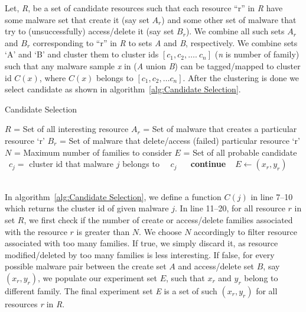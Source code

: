 Let, \emph{R}, be a set of candidate resources such that each resource ``r'' in \emph{R} have some malware set that create it (say set $A_r$) and some other set of malware that try to (unsuccessfully) access/delete it (say set $B_r$).
We combine all such sets $A_r$ and $B_r$ corresponding to ``r'' in \emph{R} to sets \emph{A} and \emph{B}, respectively.
We combine sets `A' and `B' and cluster them to cluster ids $[c_1,c_2,\ldots.\ c_n]$ (\emph{n} is number of family) such that any malware sample \emph{x} in (\emph{A} union \emph{B}) can be tagged/mapped to cluster id $C(x)$, where $C(x)$ belongs to $[c_1, c_2, \ldots c_n]$.
After the clustering is done we select candidate as shown in algorithm~\autoref{alg:Candidate Selection}.
\begin{algorithm}[ht]
\caption{Candidate Selection}
\label{alg:Candidate Selection}
\begin{algorithmic}[1]
    \State$R$   = Set of all interesting resource
    \State$A_r$ = Set of malware that creates a particular resource `r'
    \State$B_r$ = Set of malware that delete/access (failed) particular resource `r'
    \State$N$   = Maximum number of families to consider
    \State$E$   = Set of all probable candidate
      \State\ $c_j =$ cluster id that malware $j$ belongs to
      \State\ \Return\ $c_j$
    \EndFunction\
        \State\ \textbf{continue}
      \EndIf\
          \State$E\gets (x_r, y_r)$
        \EndIf\
      \EndFor\
    \EndFor\
  \end{algorithmic}
\end{algorithm}

In algorithm~\autoref{alg:Candidate Selection}, we define a function $C(j)$ in line 7--10 which returns the cluster id of given malware $j$.
In line 11--20, for all resource $r$ in set $R$, we first check if the number of create or access/delete families associated with the resource $r$ is greater than $N$.
We choose $N$ accordingly to filter resource associated with too many families.
If true, we simply discard it, as resource modified/deleted by too many families is less interesting.
If false, for every possible malware pair between the create set $A$ and access/delete set $B$, say $(x_r,y_r)$, we populate our experiment set $E$, such that $x_r$ and $y_r$ belong to different family.
The final experiment set \emph{E} is a set of such $(x_r, y_r)$ for all resources \emph{r} in \emph{R}.


